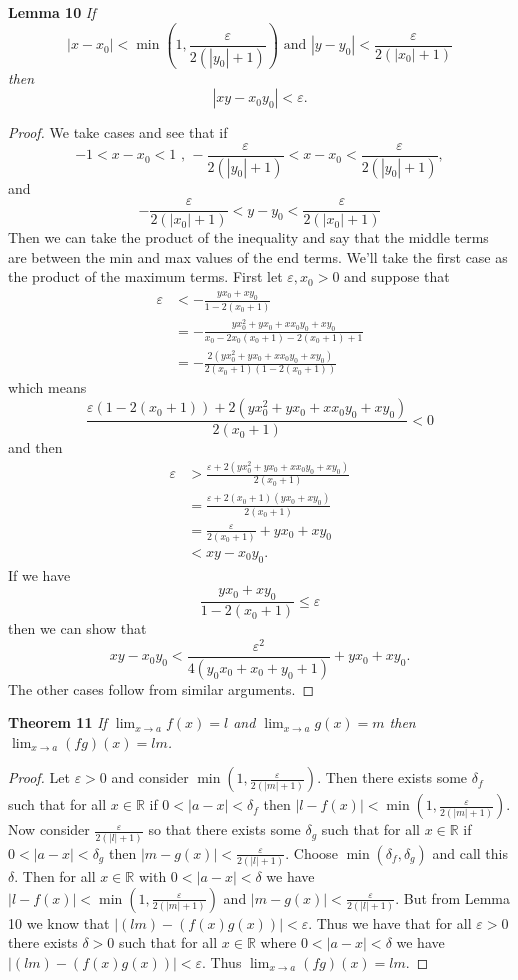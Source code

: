 \documentclass{article}
\begin{document}
\begin{flushleft}
\textbf{Lemma 10}
\textsl{If
\[
|x-x_0| < \min \left(1, \frac{\varepsilon}{2 (|y_0| + 1)} \right) \text{ and } |y-y_0| < \frac{\varepsilon}{2 (|x_0| + 1)}
\]
then
\[
|xy-x_0y_0| < \varepsilon.
\]}
\begin{proof}
We take cases and see that if
\[
-1 < x-x_0 < 1 \text{ , } -\frac{\varepsilon}{2 (|y_0| + 1)} < x-x_0 < \frac{\varepsilon}{2 (|y_0| + 1)},
\]
and
\[
-\frac{\varepsilon}{2 (|x_0| + 1)} < y-y_0 < \frac{\varepsilon}{2 (|x_0| + 1)}
\]
Then we can take the product of the inequality and say that the middle terms are between the min and max values of the end terms. We'll take the first case as the product of the maximum terms. First let $\varepsilon, x_0 > 0$ and suppose that
\begin{align*}
\varepsilon & < -\frac{yx_0 + xy_0}{1-2(x_0 + 1)} \\
		  & = -\frac{yx_0^2 + yx_0 + xx_0y_0 + xy_0}{x_0-2x_0(x_0+1) - 2(x_0+1) + 1} \\
		  & = -\frac{2(yx_0^2+yx_0+xx_0y_0+xy_0)}{2(x_0+1)(1-2(x_0+1))}
\end{align*}
which means
\[
\frac{\varepsilon (1-2(x_0+1)) + 2(yx_0^2 + yx_0 + xx_0y_0 + xy_0)}{2(x_0+1)} < 0
\]
and then
\begin{align*}
\varepsilon & > \frac{\varepsilon + 2(yx_0^2 + yx_0 + xx_0y_0 + xy_0)}{2(x_0+1)} \\
		  & = \frac{\varepsilon + 2(x_0 + 1)(yx_0+xy_0)}{2(x_0+1)} \\
		  & = \frac{\varepsilon}{2(x_0+1)} + yx_0 + xy_0 \\
		  & < xy - x_0y_0.
\end{align*}
If we have
\[
\frac{yx_0+xy_0}{1-2(x_0+1)} \leq \varepsilon
\]
then we can show that
\[
xy - x_0y_0 < \frac{\varepsilon^2}{4(y_0x_0 + x_0 + y_0 + 1)} + yx_0 + xy_0.
\]
The other cases follow from similar arguments.
\end{proof}

\textbf{Theorem 11}
\textsl{If $\lim_{x \rightarrow a} f(x) = l$ and $\lim_{x \rightarrow a} g(x) = m$ then $\lim_{x \rightarrow a} (fg)(x) = lm$.}
\begin{proof}
Let $\varepsilon > 0$ and consider $\min \left(1, \frac{\varepsilon}{2 (|m| + 1)} \right)$. Then there exists some $\delta_f$ such that for all $x \in \mathbb{R}$ if $0 < |a - x| < \delta_f$ then $|l - f(x)| < \min \left(1, \frac{\varepsilon}{2 (|m| + 1)} \right)$. Now consider $\frac{\varepsilon}{2 (|l| + 1)}$ so that there exists some $\delta_g$ such that for all $x \in \mathbb{R}$ if $0 < |a - x| < \delta_g$ then $|m - g(x)| < \frac{\varepsilon}{2 (|l| + 1)}$. Choose $\min (\delta_f, \delta_g)$ and call this $\delta$. Then for all $x \in \mathbb{R}$ with $0 < |a-x| < \delta$ we have $|l - f(x)| < \min \left(1, \frac{\varepsilon}{2 (|m| + 1)} \right)$ and $|m - g(x)| < \frac{\varepsilon}{2 (|l| + 1)}$. But from Lemma 10 we know that $|(lm)-(f(x)g(x))| < \varepsilon$. Thus we have that for all $\varepsilon > 0$ there exists $\delta > 0$ such that for all $x \in \mathbb{R}$ where $0 < |a-x| < \delta$ we have $|(lm)-(f(x)g(x))| < \varepsilon$. Thus $\lim_{x \rightarrow a} (fg)(x) = lm$.
\end{proof}


\end{flushleft}
\end{document}
